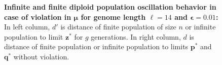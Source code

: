 \begin{figure}[h]
\begin{center}
\hspace{-3em}%
\vspace{-0.5em}  \hspace{-3em}%


\caption[\textbf{Infinite and finite diploid population oscillation behavior in case of violation in $\bm{\mu}$ for genome length $\ell = 14$ and $\bm{\epsilon} = 0.01$}]{\textbf{Infinite and finite diploid population oscillation behavior in case of violation in $\bm{\mu}$ for genome length $\ell = 14$ and $\bm{\epsilon} = 0.01$:} 
  In left column, $d'$ is distance of finite population of size $n$ or infinite population to limit $\bm{z}^\ast$ for $g$ generations. In right column, $d$ is distance of finite population or infinite population to limits $\bm{p}^\ast$ and $\bm{q}^\ast$ without violation.}
\label{oscillation_14d_vio_mu_0.01}
\end{center}
\end{figure}

